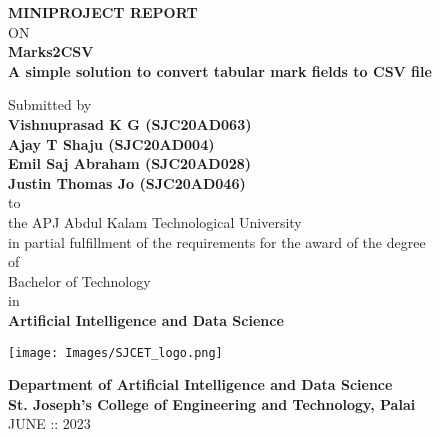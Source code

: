 \thispagestyle{empty}
\begin{center}
 
{\normalsize \bf MINIPROJECT REPORT}\\
ON\\
\vspace*{0.2 cm}
{\huge \bf Marks2CSV}\\
{\normalsize \bf A simple solution to convert tabular mark fields to CSV file}

   \vspace{0.5 cm}
   \large Submitted by\\
   { \bf Vishnuprasad K G (SJC20AD063)}\\
   { \bf Ajay T Shaju (SJC20AD004)}\\
   { \bf Emil Saj Abraham (SJC20AD028)}\\
   { \bf Justin Thomas Jo (SJC20AD046)}\\[-0.6mm]
  {\large to\\[-0.6mm] the APJ Abdul Kalam Technological University\\[-0.6mm] in partial fulfillment of the requirements for the award of the degree\\[-0.6mm] of\\[-0.6mm] Bachelor of Technology\\[-0.6mm] in\\[-0.6mm] {\bf Artificial Intelligence and Data Science}}
  
   \begin{center}
   \texttt{[image: Images/SJCET\_logo.png]}
   \end{center}
   \vspace*{-0.5cm}
  {\LARGE {\bf Department of Artificial Intelligence and Data Science}}\\
          [-3mm] {\large {\bf St. Joseph's College of Engineering and Technology, Palai}\\
           [1mm] JUNE :: 2023}

\end{center}



\newpage

